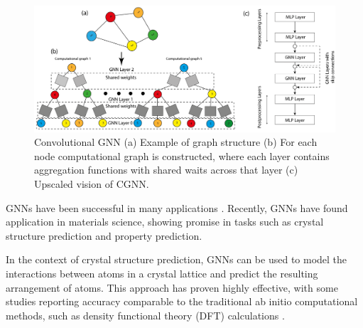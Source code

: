 \begin{figure}[H]
    \noindent
    \centering
    \includegraphics[width=12.6cm]{figures/GNNs_2.png}
    \caption{Convolutional GNN (a) Example of graph structure (b) For each node computational graph is constructed, where each layer contains aggregation functions with shared waits across that layer (c) Upscaled vision of CGNN.}
    \label{fig:gnn}
\end{figure}

GNNs have been successful in many applications \cite{zhou2020graph}.  Recently, GNNs have found application in materials science, showing promise in tasks such as crystal structure prediction and property prediction.

In the context of crystal structure prediction, GNNs can be used to model the interactions between atoms in a crystal lattice and predict the resulting arrangement of atoms. This approach has proven highly effective, with some studies reporting accuracy comparable to the traditional ab initio computational methods, such as density functional theory (DFT) calculations \cite{xie2018crystal, li2023graph}.

